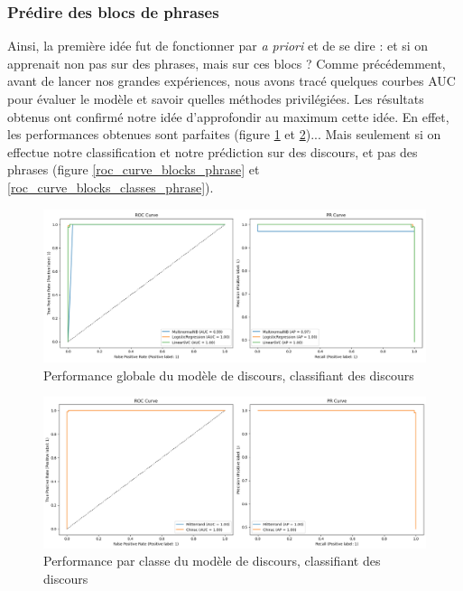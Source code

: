 \documentclass{article}
\begin{document}
\subsubsection{Prédire des blocs de phrases}

Ainsi, la première idée fut de fonctionner par \textit{a priori} et de se dire : et si on apprenait non pas sur des phrases, mais sur ces blocs ? Comme précédemment, avant de lancer nos grandes expériences, nous avons tracé quelques courbes AUC pour évaluer le modèle et savoir quelles méthodes privilégiées. Les résultats obtenus ont confirmé notre idée d'approfondir au maximum cette idée. En effet, les performances obtenues sont parfaites (figure \ref{roc_curve_blocks} et \ref{roc_curve_blocks_classes})... Mais seulement si on effectue notre classification et notre prédiction sur des discours, et pas des phrases (figure \ref{roc_curve_blocks_phrase} et \ref{roc_curve_blocks_classes_phrase}).

\begin{figure}[H]
    \centering
    \includegraphics[width=\textwidth]{./src/locuteur/roc_curve_blocks.png} 
    \caption{Performance globale du modèle de discours, classifiant des discours}
    \label{roc_curve_blocks}
\end{figure}

\begin{figure}[H]
    \centering
    \includegraphics[width=\textwidth]{./src/locuteur/roc_curve_blocks_classes.png} 
    \caption{Performance par classe du modèle de discours, classifiant des discours}
    \label{roc_curve_blocks_classes}
\end{figure}
\end{document}
